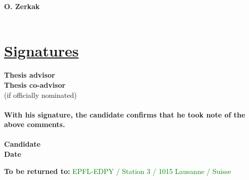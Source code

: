 \documentclass[11pt,titlepage]{article}
\begin{document}
\noindent\textbf{O. Zerkak}\\\\


\section*{\underline{Signatures}\\}
\noindent \textbf{Thesis advisor}\hspace{6.25cm}\dotfill\vspace{0.5cm}\\

\noindent \textbf{Thesis co-advisor}\hspace{5.7cm}\dotfill\\
\noindent  (if officially nominated)\\\\

\noindent \textbf{With his signature, the candidate confirms that he took note 
                  of the above comments.}\\\\

\noindent \textbf{Candidate}\hspace{7cm}\dotfill\vspace{0.5cm}\\

\noindent \textbf{Date}\hspace{8.05cm}\dotfill\\

\vspace{0.8cm}
\begin{center}
\textbf{To be returned to:} \textcolor{green}{EPFL-EDPY / Station 3 
                                              / 1015 Lausanne / Suisse}
\end{center}

%
\end{document}
